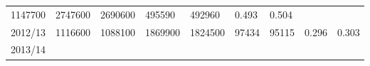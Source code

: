 \documentclass[
  spanish,
]{article}
\begin{document}
\begin{longtable}[]{@{}lllllllll@{}}
\begin{minipage}[t]{0.10\columnwidth}
1147700\strut
\end{minipage} & \begin{minipage}[t]{0.09\columnwidth}\raggedright
2747600\strut
\end{minipage} & \begin{minipage}[t]{0.10\columnwidth}\raggedright
2690600\strut
\end{minipage} & \begin{minipage}[t]{0.08\columnwidth}\raggedright
495590\strut
\end{minipage} & \begin{minipage}[t]{0.09\columnwidth}\raggedright
492960\strut
\end{minipage} & \begin{minipage}[t]{0.08\columnwidth}\raggedright
0.493\strut
\end{minipage} & \begin{minipage}[t]{0.09\columnwidth}\raggedright
0.504\strut
\end{minipage}\tabularnewline
\begin{minipage}[t]{0.06\columnwidth}\raggedright
2012/13\strut
\end{minipage} & \begin{minipage}[t]{0.09\columnwidth}\raggedright
1116600\strut
\end{minipage} & \begin{minipage}[t]{0.10\columnwidth}\raggedright
1088100\strut
\end{minipage} & \begin{minipage}[t]{0.09\columnwidth}\raggedright
1869900\strut
\end{minipage} & \begin{minipage}[t]{0.10\columnwidth}\raggedright
1824500\strut
\end{minipage} & \begin{minipage}[t]{0.08\columnwidth}\raggedright
97434\strut
\end{minipage} & \begin{minipage}[t]{0.09\columnwidth}\raggedright
95115\strut
\end{minipage} & \begin{minipage}[t]{0.08\columnwidth}\raggedright
0.296\strut
\end{minipage} & \begin{minipage}[t]{0.09\columnwidth}\raggedright
0.303\strut
\end{minipage}\tabularnewline
\begin{minipage}[t]{0.06\columnwidth}\raggedright
2013/14\strut

\end{minipage}
\end{longtable}
\end{document}
